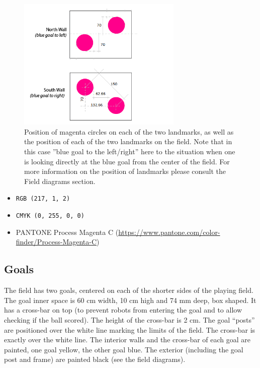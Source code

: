 \documentclass{article}
\begin{document}
\begin{figure}[H]
    \centering
    \includegraphics[width=0.7\textwidth]{media/landmarks_blueprint.png}
    \caption{Position of magenta circles on each of the two landmarks, as well
        as the position of each of the two landmarks on the field. Note that in
        this case ''blue goal to the left/right'' here to the situation when
        one is looking directly at the blue goal from the center of the field.
        For more information on the position of landmarks please consult the
        Field diagrams section.}
    \label{fig:landmarks_blueprint}
\end{figure}


\begin{itemize}
    \item \texttt{RGB (217, 1, 2)}
    \item \texttt{CMYK (0, 255, 0, 0)}
    \item PANTONE Process Magenta C (\url{https://www.pantone.com/color-finder/Process-Magenta-C})
\end{itemize}

\subsection{ Goals \label{ref-032}}

The field has two goals, centered on each of the shorter sides of the playing
field. The goal inner space is 60 cm width, 10 cm high and 74 mm deep, box
shaped. It has a cross-bar on top (to prevent robots from entering the goal and
to allow checking if the ball scored). The height of the cross-bar is 2 cm. The
goal ``posts'' are positioned over the white line marking the limits of the
field. The cross-bar is exactly over the white line. The interior walls and the
cross-bar of each goal are painted, one goal yellow, the other goal blue. The
exterior (including the goal post and frame) are painted black (see the field
diagrams).
\end{document}

